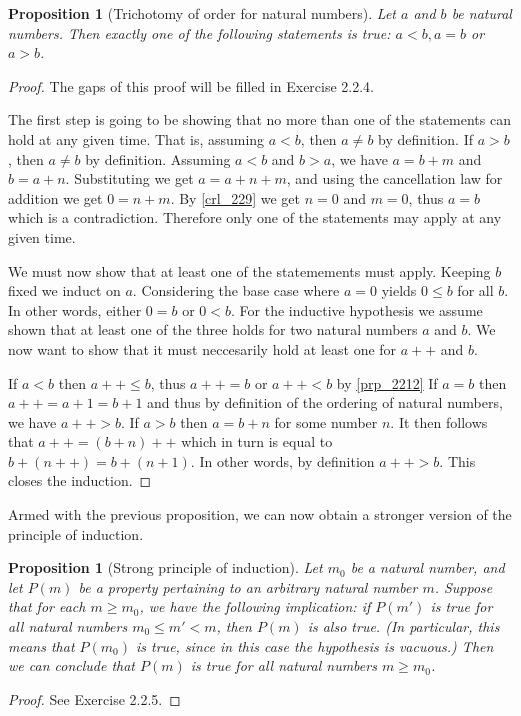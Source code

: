 \documentclass[a4paper, twocolumn]{report}
\newcounter{dummy} \numberwithin{dummy}{section}
\newtheorem{prp}[dummy]{Proposition}
\theoremstyle{definition}
\theoremstyle{solution}
\newcommand{\dplus}{{+}{+}} %
\begin{document}
\begin{prp}[Trichotomy of order for natural numbers]
  \label{prp_2213}
  Let $a$ and $b$ be natural numbers. Then exactly one of the following
  statements is true: $a < b, a = b$ or $a > b$.
\end{prp}
\begin{proof}
  The gaps of this proof will be filled in Exercise 2.2.4.

  The first step is going to be showing that no more than one of the statements
  can hold at any given time.  That is, assuming $a < b$, then $a \neq b$ by
  definition. If $a > b$, then $ a \neq b$ by definition.  Assuming $a < b$ and
  $b > a$, we have $ a = b + m$ and $b = a + n$. Substituting we get $ a = a +
  n + m$, and using the cancellation law for addition we get $0 = n + m$. By
  \ref{crl_229} we get $n = 0$ and $m = 0$, thus $a = b$ which is a
  contradiction. Therefore only one of the statements may apply at any given
  time.

  We must now show that at least one of the statemements must apply. Keeping
  $b$ fixed we induct on $a$. Considering the base case where $a = 0$ yields $0
  \leq b$ for all $b$.  In other words, either $0 = b$ or $0 < b$.  For the
  inductive hypothesis we assume shown that at least one of the three holds for
  two natural numbers $a$ and $b$. We now want to show that it must neccesarily
  hold at least one for $a\dplus$ and $b$.

  If $a < b$ then $a\dplus \leq b$, thus $a\dplus = b$ or $a\dplus < b$ by
  \ref{prp_2212} If $a = b$ then $a\dplus = a + 1 = b + 1$ and thus by
  definition of the ordering of natural numbers, we have $a\dplus > b$.  If $a
  > b$ then $a = b + n$ for some number $n$. It then follows that $a\dplus = (b
  + n)\dplus$ which in turn is equal to $b + (n\dplus) = b + (n + 1)$. In other
  words, by definition $a\dplus > b$.  This closes the induction.
\end{proof}

Armed with the previous proposition, we can now obtain a stronger version of
the principle of induction.

\begin{prp}[Strong principle of induction]
  \label{prp_2214}
  Let $m_0$ be a natural number, and let $P(m)$ be a property pertaining to an
  arbitrary natural number $m$. Suppose that for each $m \geq m_0$, we have the
  following implication: if $P(m')$ is true for all natural numbers $m_0 \leq
  m' < m$, then $P(m)$ is also true. (In particular, this means that $P(m_0)$
  is true, since in this case the hypothesis is vacuous.) Then we can conclude
  that $P(m)$ is true for all natural numbers $m \geq m_0$.
\end{prp}
\begin{proof}
  See Exercise 2.2.5.
\end{proof}
\end{document}
